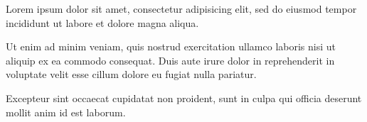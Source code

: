 \documentclass{article}
\begin{document}
Lorem ipsum dolor sit amet, consectetur adipisicing elit, sed do eiusmod
tempor incididunt ut labore et dolore magna aliqua.

\begin{clozepar}
Ut enim ad minim veniam, quis nostrud exercitation ullamco laboris nisi
ut aliquip ex ea commodo consequat. Duis aute irure dolor in
reprehenderit in voluptate velit esse cillum dolore eu fugiat nulla
pariatur.
\end{clozepar}

Excepteur sint occaecat cupidatat non proident, sunt in culpa qui
officia deserunt mollit anim id est laborum.
\end{document}
